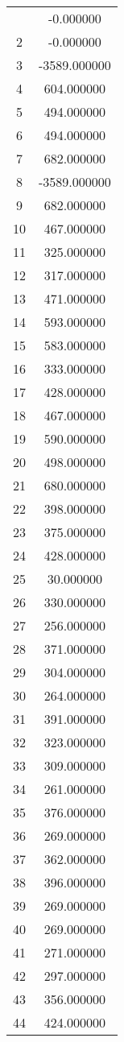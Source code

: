 \documentclass[12pt]{article}
\begin{document}
\begin{longtable}{@{}cc@{}}
\bottomrule
\endlastfoot
1 & -0.000000 \\
2 & -0.000000 \\
3 & -3589.000000 \\
4 & 604.000000 \\
5 & 494.000000 \\
6 & 494.000000 \\
7 & 682.000000 \\
8 & -3589.000000 \\
9 & 682.000000 \\
10 & 467.000000 \\
11 & 325.000000 \\
12 & 317.000000 \\
13 & 471.000000 \\
14 & 593.000000 \\
15 & 583.000000 \\
16 & 333.000000 \\
17 & 428.000000 \\
18 & 467.000000 \\
19 & 590.000000 \\
20 & 498.000000 \\
21 & 680.000000 \\
22 & 398.000000 \\
23 & 375.000000 \\
24 & 428.000000 \\
25 & 30.000000 \\
26 & 330.000000 \\
27 & 256.000000 \\
28 & 371.000000 \\
29 & 304.000000 \\
30 & 264.000000 \\
31 & 391.000000 \\
32 & 323.000000 \\
33 & 309.000000 \\
34 & 261.000000 \\
35 & 376.000000 \\
36 & 269.000000 \\
37 & 362.000000 \\
38 & 396.000000 \\
39 & 269.000000 \\
40 & 269.000000 \\
41 & 271.000000 \\
42 & 297.000000 \\
43 & 356.000000 \\
44 & 424.000000 \\

\end{longtable}
\end{document}
